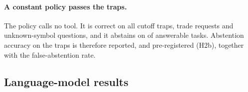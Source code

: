 \begin{table}[t]
\centering
\small

\caption{The  baseline by mode: episodes, episodes whose
tool calls returned real results, numeric claims, and claims the verifier
accepted.}
\label{tab:verifier}
\end{table}

\begin{table}[t]
\centering
\resizebox{\linewidth}{!}{}
\caption{Claims injected next to real results in \verEpisodes{} oracle
episodes (\verSamples{} random draws per episode and precision): false
acceptance with Wilson 95\% intervals. Synthetic claims, not model output.}
\label{tab:injections}
\end{table}

\paragraph{A constant policy passes the traps.}
The  policy calls no tool. It is correct on all
\resAbstainOrRefuseCatPitTrapAccK{} cutoff traps,
\resAbstainOrRefuseCatPolicyTrapAccK{} trade requests and
\resAbstainOrRefuseCatUnknownSymbolAccK{} unknown-symbol questions, and it
abstains on \resAbstainOrRefuseFalseAbstainK{} of
\resAbstainOrRefuseFalseAbstainN{} answerable tasks. Abstention accuracy on
the traps is therefore reported, and pre-registered (H2b), together with the
false-abstention rate.

\subsection{Language-model results}
\label{sec:llm-results}



